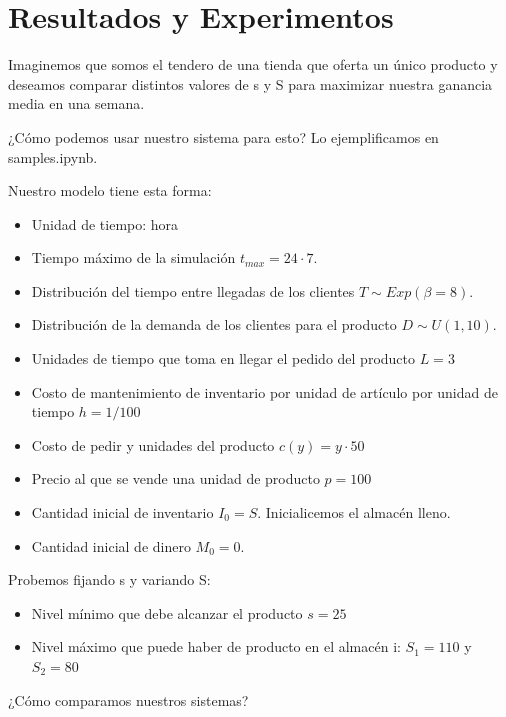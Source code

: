 \documentclass{article}
\begin{document}
\section*{Resultados y Experimentos}

Imaginemos que somos el tendero de una tienda que oferta un único producto y deseamos comparar distintos valores de s y S para maximizar nuestra ganancia media en una semana.

\vspace{\baselineskip}

¿Cómo podemos usar nuestro sistema para esto? Lo ejemplificamos en samples.ipynb.

\vspace{\baselineskip}

Nuestro modelo tiene esta forma:
\begin{itemize}
    \item Unidad de tiempo: hora
    \item  Tiempo máximo de la simulación $t_{max} = 24 \cdot 7$.
    \item  Distribución del tiempo entre llegadas de los clientes $T \sim Exp(\beta = 8)$.
    \item  Distribución de la demanda de los clientes para el producto $D \sim U(1,10)$.
    \item Unidades de tiempo que toma en llegar el pedido del producto $L = 3$
    \item Costo de mantenimiento de inventario por unidad de artículo por unidad de tiempo $h=1/100$
    \item Costo de pedir y unidades del producto $c(y) = y \cdot 50$
    \item Precio al que se vende una unidad de producto $p = 100$
    \item Cantidad inicial de inventario $I_0 = S$. Inicialicemos el almacén lleno.
    \item Cantidad inicial de dinero $M_0 = 0$.
\end{itemize}

Probemos fijando s y variando S:
\begin{itemize}
    \item Nivel mínimo que debe alcanzar el producto $s = 25$
    \item Nivel máximo que puede haber de producto en el almacén i:
    $S_1 = 110$ y $S_2 = 80$
\end{itemize}

¿Cómo comparamos nuestros sistemas?

\vspace{\baselineskip}
\end{document}
